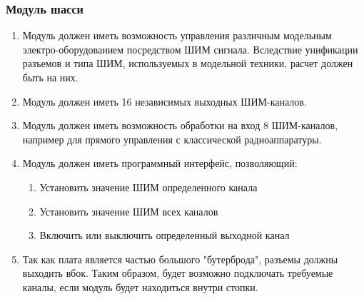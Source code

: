 \documentclass[utf8]{report}
\begin{document}
\subsubsection{Модуль шасси}
\begin{enumerate}
  \item Модуль должен иметь возможность управления различным модельным электро-оборудованием посредством ШИМ сигнала. Вследствие унификации разъемов и типа ШИМ, используемых в модельной техники, расчет должен быть на них.
  \item Модуль должен иметь 16 независимых выходных ШИМ-каналов.
  \item Модуль должен иметь возможность обработки на вход 8 ШИМ-каналов, например для прямого управления с классической радиоаппаратуры.
  \item Модуль должен иметь программный интерфейс, позволяющий:
  \begin{enumerate}
    \item Установить значение ШИМ определенного канала
    \item Установить значение ШИМ всех каналов
    \item Включить или выключить определенный выходной канал
  \end{enumerate}
  \item Так как плата является частью большого "бутерброда", разъемы должны выходить вбок. Таким образом, будет возможно подключать требуемые каналы, если модуль будет находиться внутри стопки.
\end{enumerate}
\end{document}
